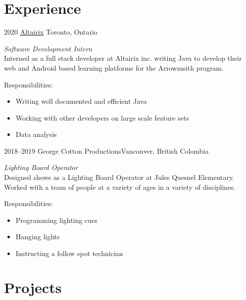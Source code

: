 \documentclass[]{style}
\begin{document}
\section{Experience}

\begin{entrylist}


\entry
{2020}
{\href{https://www.altairix.com/}{Altairix}}
{Toronto, Ontario}
{\emph{Software Development Intern} \\
Interned as a full stack developer at Altairix inc. writing Java to develop their web and Android based learning platforms for the Arrowmsith program.

Responsibilities:

\begin{itemize}
	\item Writing well documented and efficient Java
	\item Working with other developers on large scale feature sets
	\item Data analysis
\end{itemize}}


\entry
{2018–2019}
{George Cotton Productions}{Vancouver, British Colombia}
{\emph{Lighting Board Operator} \\
Designed shows as a Lighting Board Operator at Jules Quesnel Elementary. Worked with a team of people at a variety of ages in a variety of disciplines.

Responsibilities:

\begin{itemize}
	\item Programming lighting cues
	\item Hanging lights
	\item Instructing a follow spot technician
\end{itemize}}


\end{entrylist}



\section{Projects}
\end{document}
